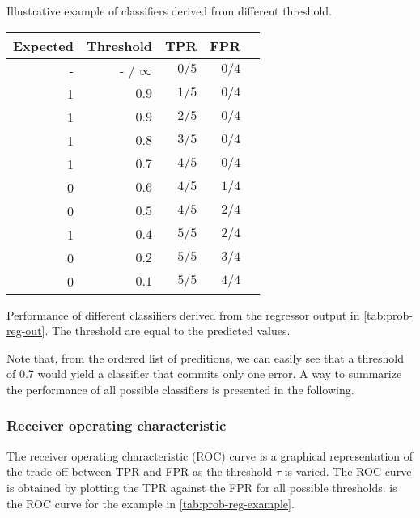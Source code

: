 \begin{tablebox}[label=tab:prob-reg-example]{Illustrative example of classifiers derived
  from different threshold.}
  \centering
  \begin{tabular}{rrrrr}
    \toprule
    \textbf{Expected} & \textbf{Threshold} & \textbf{TPR} & \textbf{FPR}  \\
    \midrule
    - & - / $\infty$ & $0/5$ & $0/4$ \\
    1 & $0.9$        & $1/5$ & $0/4$ \\
    1 & $0.9$        & $2/5$ & $0/4$ \\
    1 & $0.8$        & $3/5$ & $0/4$ \\
    1 & $0.7$        & $4/5$ & $0/4$ \\
    0 & $0.6$        & $4/5$ & $1/4$ \\
    0 & $0.5$        & $4/5$ & $2/4$ \\
    1 & $0.4$        & $5/5$ & $2/4$ \\
    0 & $0.2$        & $5/5$ & $3/4$ \\
    0 & $0.1$        & $5/5$ & $4/4$ \\
    \bottomrule
  \end{tabular}
  \tcblower
  Performance of different classifiers derived from the regressor output in
  \cref{tab:prob-reg-out}.  The threshold are equal to the predicted values.
\end{tablebox}

Note that, from the ordered list of preditions, we can easily see that a threshold of 0.7
would yield a classifier that commits only one error.  A way to summarize the performance
of all possible classifiers is presented in the following.

\subsubsection{Receiver operating characteristic}

The receiver operating characteristic (ROC) curve is a graphical representation of the
trade-off between TPR and FPR as the threshold
$\tau$ is varied.  The ROC curve is obtained by plotting the TPR against the FPR for all
possible thresholds.   is the ROC curve for the example in
\cref{tab:prob-reg-example}.

